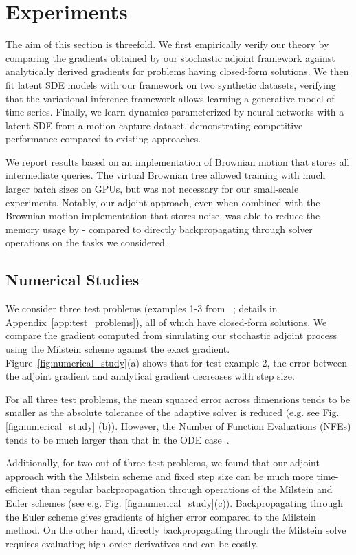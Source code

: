 \documentclass[twoside]{article}
\begin{document}
\section{Experiments}
\vspace{-2mm}
The aim of this section is threefold.
We first empirically verify our theory by comparing the gradients obtained by our stochastic adjoint framework against analytically derived gradients for problems having closed-form solutions. 
We then fit latent SDE models with our framework on two synthetic datasets, verifying that the variational inference framework allows learning a generative model of time series. 
Finally, we learn dynamics parameterized by neural networks with a latent SDE from a motion capture dataset, demonstrating competitive performance compared to existing approaches.

We report results based on an implementation of Brownian motion that stores all intermediate queries.
The virtual Brownian tree allowed training with much larger batch sizes on GPUs, but was not necessary for our small-scale experiments.
Notably, our adjoint approach, even when combined with the Brownian motion implementation that stores noise, was able to reduce the memory usage by - compared to directly backpropagating through solver operations on the tasks we considered.

\subsection{Numerical Studies}
We consider three test problems (examples 1-3 from ~\cite{rackauckas2017adaptive}; details in Appendix~\ref{app:test_problems}), all of which have closed-form solutions. 
We compare the gradient computed from simulating our stochastic adjoint process using the Milstein scheme against the exact gradient.
Figure~\ref{fig:numerical_study}(a) shows that for test example 2, the error between the adjoint gradient and analytical gradient decreases with step size. 

For all three test problems, the mean squared error across dimensions tends to be smaller as the absolute tolerance of the adaptive solver is reduced (e.g. see Fig. \ref{fig:numerical_study} (b)). 
However, the Number of Function Evaluations (NFEs) tends to be much larger than that in the ODE case~\cite{chen2018neural}.

Additionally, for two out of three test problems, we found that our adjoint approach with the Milstein scheme and fixed step size can be much more time-efficient than regular backpropagation through operations of the Milstein and Euler schemes (see e.g. Fig. \ref{fig:numerical_study}(c)).
Backpropagating through the Euler scheme gives gradients of higher error compared to the Milstein method. 
On the other hand, directly backpropagating through the Milstein solve requires evaluating high-order derivatives and can be costly.
\end{document}
